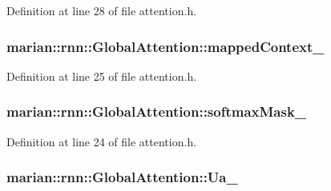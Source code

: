 Definition at line 28 of file attention.\+h.

\subsubsection[{\texorpdfstring{mapped\+Context\+\_\+}{mappedContext_}}]{ marian\+::rnn\+::\+Global\+Attention\+::mapped\+Context\+\_\+\hspace{0.3cm}{\ttfamily [private]}}\hypertarget{classmarian_1_1rnn_1_1GlobalAttention_aef1ab40f3c2a411f7734cd07388c0a23}{}\label{classmarian_1_1rnn_1_1GlobalAttention_aef1ab40f3c2a411f7734cd07388c0a23}


Definition at line 25 of file attention.\+h.

\subsubsection[{\texorpdfstring{softmax\+Mask\+\_\+}{softmaxMask_}}]{ marian\+::rnn\+::\+Global\+Attention\+::softmax\+Mask\+\_\+\hspace{0.3cm}{\ttfamily [private]}}\hypertarget{classmarian_1_1rnn_1_1GlobalAttention_a10695339c62a5255c51ade9b35dac607}{}\label{classmarian_1_1rnn_1_1GlobalAttention_a10695339c62a5255c51ade9b35dac607}


Definition at line 24 of file attention.\+h.

\subsubsection[{\texorpdfstring{Ua\+\_\+}{Ua_}}]{ marian\+::rnn\+::\+Global\+Attention\+::\+Ua\+\_\+\hspace{0.3cm}{\ttfamily [private]}}\hypertarget{classmarian_1_1rnn_1_1GlobalAttention_a9d757c0f590f8a9fa8a94cca6e67e853}{}\label{classmarian_1_1rnn_1_1GlobalAttention_a9d757c0f590f8a9fa8a94cca6e67e853}


